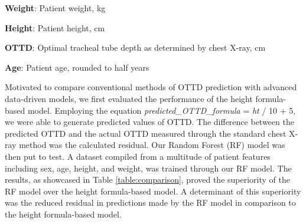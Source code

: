 \documentclass[11pt]{article}
\begin{document}
\begin{table}[h]
\caption{Descriptive statistics of the dataset, stratified by sex}
\label{table:descriptive}
\begin{threeparttable}
\renewcommand{\TPTminimum}{\linewidth}
\begin{tablenotes}
\footnotesize
\item \textbf{Weight}: Patient weight, kg
\item \textbf{Height}: Patient height, cm
\item \textbf{OTTD}: Optimal tracheal tube depth as determined by chest X-ray, cm
\item \textbf{Age}: Patient age, rounded to half years
\end{tablenotes}
\end{threeparttable}
\end{table}


Motivated to compare conventional methods of OTTD prediction with advanced data-driven models, we first evaluated the performance of the height formula-based model. Employing the equation \textit{predicted\_OTTD\_formula} = \textit{ht} / 10 + 5, we were able to generate predicted values of OTTD. The difference between the predicted OTTD and the actual OTTD measured through the standard chest X-ray method was the calculated residual. Our Random Forest (RF) model was then put to test. A dataset compiled from a multitude of patient features including sex, age, height, and weight, was trained through our RF model. The results, as showcased in Table {}\ref{table:comparison}, proved the superiority of the RF model over the height formula-based model. A determinant of this superiority was the reduced residual in predictions made by the RF model in comparison to the height formula-based model.
\end{document}
